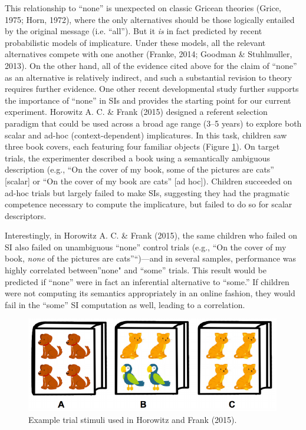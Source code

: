 \documentclass[10pt, letterpaper]{article}
\newenvironment{CodeChunk}{}{}
\begin{document}
This relationship to ``none'' is unexpected on classic Gricean theories
(Grice, 1975; Horn, 1972), where the only alternatives should be those
logically entailed by the original message (i.e. ``all''). But it
\emph{is} in fact predicted by recent probabilistic models of
implicature. Under these models, all the relevant alternatives compete
with one another (Franke, 2014; Goodman \& Stuhlmuller, 2013). On the
other hand, all of the evidence cited above for the claim of ``none'' as
an alternative is relatively indirect, and such a substantial revision
to theory requires further evidence. One other recent developmental
study further supports the importance of ``none'' in SIs and provides
the starting point for our current experiment. Horowitz A. C. \& Frank
(2015) designed a referent selection paradigm that could be used across
a broad age range (3--5 years) to explore both scalar and ad-hoc
(context-dependent) implicatures. In this task, children saw three book
covers, each featuring four familiar objects (Figure \ref{fig:image}).
On target trials, the experimenter described a book using a semantically
ambiguous description (e.g., ``On the cover of my book, some of the
pictures are cats'' {[}scalar{]} or ``On the cover of my book are cats''
{[}ad hoc{]}). Children succeeded on ad-hoc trials but largely failed to
make SIs, suggesting they had the pragmatic competence necessary to
compute the implicature, but failed to do so for scalar descriptors.

Interestingly, in Horowitz A. C. \& Frank (2015), the same children who
failed on SI also failed on unambiguous ``none'' control trials (e.g.,
``On the cover of my book, \emph{none} of the pictures are
cats''``)---and in several samples, performance was highly correlated
between''none" and ``some'' trials. This result would be predicted if
``none'' were in fact an inferential alternative to ``some.'' If
children were not computing its semantics appropriately in an online
fashion, they would fail in the ``some'' SI computation as well, leading
to a correlation.

\begin{CodeChunk}
\begin{figure}[b]

{\centering \includegraphics{figs/image-1} 

}

\caption[Example trial stimuli used in Horowitz and Frank (2015)]{Example trial stimuli used in Horowitz and Frank (2015).}\label{fig:image}
\end{figure}
\end{CodeChunk}
\end{document}
